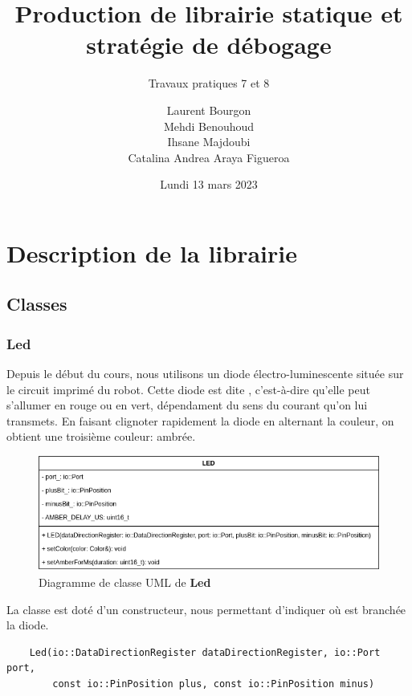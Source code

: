 \documentclass[12pt]{scrartcl}
\author{Laurent Bourgon \\Mehdi Benouhoud \\Ihsane Majdoubi \\Catalina Andrea Araya Figueroa}
\subtitle{Travaux pratiques 7 et 8}
\title{Production de librairie statique et stratégie de débogage}
\date{Lundi 13 mars 2023}
\begin{document}
\maketitle



\newpage

\section{Description de la librairie}

\subsection{Classes}
\subsubsection{Led}
Depuis le début du cours, nous utilisons un diode électro-luminescente située
sur le circuit imprimé du robot. Cette diode est dite  , c'est-à-dire
qu'elle peut s'allumer en rouge ou en vert, dépendament du sens du courant qu'on
lui transmets. En faisant clignoter rapidement la diode en alternant la couleur,
on obtient une troisième couleur: ambrée.

\begin{figure}[h]
    \centering
    \includegraphics[scale=0.75]{LED_diagramme_classe}
    \caption{Diagramme de classe UML de \textbf{Led}}
\end{figure}

La classe est doté d'un constructeur, nous permettant d'indiquer où est branchée
la diode.
\begin{verbatim}
    Led(io::DataDirectionRegister dataDirectionRegister, io::Port port,
        const io::PinPosition plus, const io::PinPosition minus)
\end{verbatim}
\end{document}
